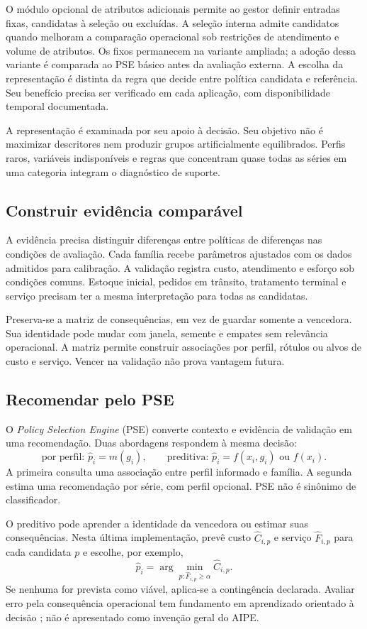 O módulo opcional de atributos adicionais permite ao gestor definir entradas fixas, candidatas à seleção ou excluídas. A seleção interna admite candidatos quando melhoram a comparação operacional sob restrições de atendimento e volume de atributos. Os fixos permanecem na variante ampliada; a adoção dessa variante é comparada ao PSE básico antes da avaliação externa. A escolha da representação é distinta da regra que decide entre política candidata e referência. Seu benefício precisa ser verificado em cada aplicação, com disponibilidade temporal documentada.

A representação é examinada por seu apoio à decisão. Seu objetivo não é maximizar descritores nem produzir grupos artificialmente equilibrados. Perfis raros, variáveis indisponíveis e regras que concentram quase todas as séries em uma categoria integram o diagnóstico de suporte.

\subsection{Construir evidência comparável}
A evidência precisa distinguir diferenças entre políticas de diferenças nas condições de avaliação. Cada família recebe parâmetros ajustados com os dados admitidos para calibração. A validação registra custo, atendimento e esforço sob condições comuns. Estoque inicial, pedidos em trânsito, tratamento terminal e serviço precisam ter a mesma interpretação para todas as candidatas.

Preserva-se a matriz de consequências, em vez de guardar somente a vencedora. Sua identidade pode mudar com janela, semente e empates sem relevância operacional. A matriz permite construir associações por perfil, rótulos ou alvos de custo e serviço. Vencer na validação não prova vantagem futura.

\subsection{Recomendar pelo PSE}
O \textit{Policy Selection Engine} (PSE) converte contexto e evidência de validação em uma recomendação. Duas abordagens respondem à mesma decisão:
\[
 \text{por perfil: }\widehat p_i=m(g_i),\qquad
 \text{preditiva: }\widehat p_i=f(x_i,g_i)\text{ ou }f(x_i).
\]
A primeira consulta uma associação entre perfil informado e família. A segunda estima uma recomendação por série, com perfil opcional. PSE não é sinônimo de classificador.

O preditivo pode aprender a identidade da vencedora ou estimar suas consequências. Nesta última implementação, prevê custo $\widehat C_{i,p}$ e serviço $\widehat F_{i,p}$ para cada candidata $p$ e escolhe, por exemplo,
\[
 \widehat p_i=\arg\min_{p:\widehat F_{i,p}\geq\alpha}\widehat C_{i,p}.
\]
Se nenhuma for prevista como viável, aplica-se a contingência declarada. Avaliar erro pela consequência operacional tem fundamento em aprendizado orientado à decisão \citep{ElmachtoubGrigas2022SPO}; não é apresentado como invenção geral do AIPE.

